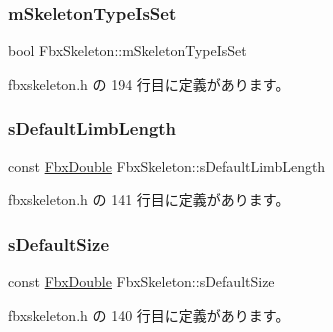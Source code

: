 \subsubsection{\texorpdfstring{m\+Skeleton\+Type\+Is\+Set}{mSkeletonTypeIsSet}}
{\footnotesize\ttfamily bool Fbx\+Skeleton\+::m\+Skeleton\+Type\+Is\+Set\hspace{0.3cm}{\ttfamily [protected]}}



 fbxskeleton.\+h の 194 行目に定義があります。

\mbox{\label{class_fbx_skeleton_a61aa3623c65047b3e7e66a173711b1ef}} 
\subsubsection{\texorpdfstring{s\+Default\+Limb\+Length}{sDefaultLimbLength}}
{\footnotesize\ttfamily const \hyperlink{fbxtypes_8h_a171e72a1c46fc15c1a6c9c31948c1c5b}{Fbx\+Double} Fbx\+Skeleton\+::s\+Default\+Limb\+Length\hspace{0.3cm}{\ttfamily [static]}}



 fbxskeleton.\+h の 141 行目に定義があります。

\mbox{\label{class_fbx_skeleton_aabac60f53d2b665f37ac74e7ac9a402a}} 
\subsubsection{\texorpdfstring{s\+Default\+Size}{sDefaultSize}}
{\footnotesize\ttfamily const \hyperlink{fbxtypes_8h_a171e72a1c46fc15c1a6c9c31948c1c5b}{Fbx\+Double} Fbx\+Skeleton\+::s\+Default\+Size\hspace{0.3cm}{\ttfamily [static]}}



 fbxskeleton.\+h の 140 行目に定義があります。

\mbox{\label{class_fbx_skeleton_aecaa95bc659ea1804ec5885d9116c1c6}} 
